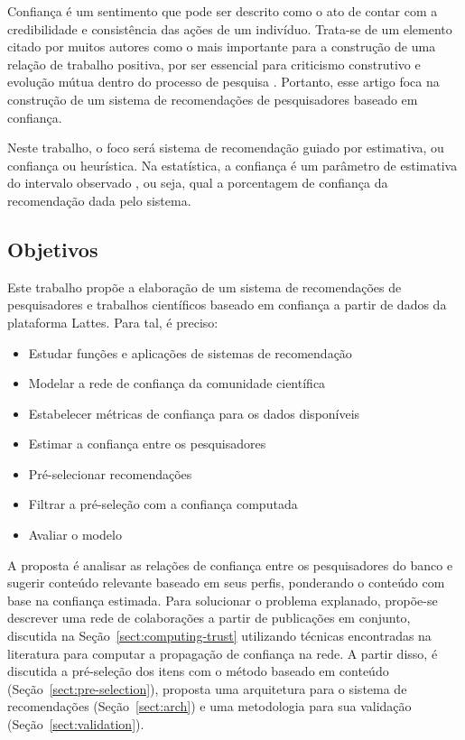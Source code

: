 \documentclass[12pt]{article}
\begin{document}
Confiança é um sentimento que pode ser descrito como o ato de contar com a credibilidade e consistência das ações de um indivíduo. Trata-se de um elemento citado por muitos autores como o mais importante para a construção de uma relação de trabalho positiva, por ser essencial para criticismo construtivo e evolução mútua dentro do processo de pesquisa \cite{bagshaw2007international}. Portanto, esse artigo foca na construção de um sistema de recomendações de pesquisadores baseado em confiança.

Neste trabalho, o foco será sistema de recomendação guiado por estimativa, ou confiança ou heurística. Na estatística, a confiança é um parâmetro
de estimativa do intervalo observado \cite{ekstrand2019recommender}, ou seja, qual a porcentagem de confiança da recomendação dada pelo sistema.

\subsection{Objetivos}

Este trabalho propõe a elaboração de um sistema de recomendações de pesquisadores e trabalhos científicos baseado 
em confiança a partir de dados da plataforma Lattes. Para tal, é preciso:

\begin{itemize}
  \item Estudar funções e aplicações de sistemas de recomendação
  \item Modelar a rede de confiança da comunidade científica
  \item Estabelecer métricas de confiança para os dados disponíveis
  \item Estimar a confiança entre os pesquisadores 
  \item Pré-selecionar recomendações
  \item Filtrar a pré-seleção com a confiança computada
  \item Avaliar o modelo
\end{itemize}

A proposta é analisar as relações de confiança entre os pesquisadores do banco e sugerir conteúdo relevante baseado em seus perfis, 
ponderando o conteúdo com base na confiança estimada. Para solucionar o problema explanado, propõe-se descrever uma rede de colaborações 
a partir de publicações em conjunto, discutida na Seção~\ref{sect:computing-trust} utilizando técnicas encontradas na literatura para computar a propagação de confiança na rede. A partir disso, é discutida a pré-seleção dos itens com o método baseado em conteúdo (Seção~\ref{sect:pre-selection}), proposta uma arquitetura para o sistema de recomendações (Seção~\ref{sect:arch}) e uma metodologia para sua validação (Seção~\ref{sect:validation}).
\end{document}
